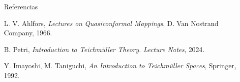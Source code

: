 \documentclass[final]{beamer}
\newlength{\sepwidth}
\newlength{\colwidth}
\newcommand{\separatorcolumn}{\begin{column}{\sepwidth}\end{column}}
\begin{document}
\begin{frame}[t,fragile]
\begin{columns}[t]
\begin{column}{\colwidth}
\begin{block}{Referencias}
\begin{thebibliography}{9}
L. V. Ahlfors, \textit{Lectures on Quasiconformal Mappings}, D. Van Nostrand Company, 1966.

B. Petri, \textit{Introduction to Teichmüller Theory. Lecture Notes}, 2024.

Y. Imayoshi, M. Taniguchi, \textit{An Introduction to Teichmüller Spaces}, Springer, 1992.


\end{thebibliography}
\end{block}
\end{column}

\separatorcolumn

\end{columns}
\end{frame}
\end{document}
